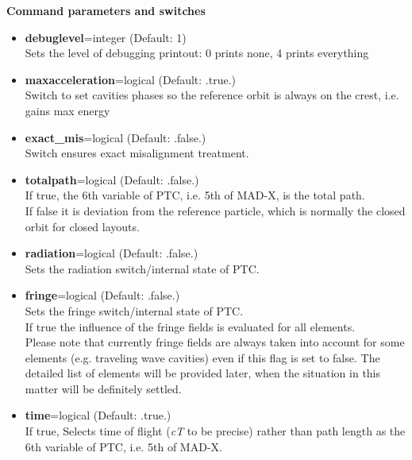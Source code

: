 {\bf Command parameters and switches}
\begin{itemize}
   \item {\bf debuglevel}=integer (Default: 1)\\
     Sets the level of debugging printout: 0 prints none, 4 prints everything   

   \item {\bf maxacceleration}=logical (Default: .true.)\\
     Switch to set cavities phases so the reference orbit is always on
     the crest, i.e. gains max energy    

   \item {\bf exact\_mis}=logical (Default: .false.)\\
     Switch ensures exact misalignment treatment.   

   \item {\bf totalpath}=logical  (Default: .false.)\\
     If true, the 6th variable of PTC, i.e. 5th of MAD-X, is the total
     path.  \\
     If false it is deviation from the reference particle,
     which is normally the closed orbit for closed layouts.    

   \item {\bf radiation}=logical (Default: .false.)\\    
     Sets the radiation switch/internal state of PTC.   

   \item {\bf fringe}=logical (Default: .false.)\\    
     Sets the fringe switch/internal state of PTC. \\ 
     If true the influence of the fringe fields is evaluated for all
     elements. \\       
     Please note that currently fringe fields are always taken into
     account for some elements (e.g. traveling wave cavities) even if
     this flag is set to false. The detailed list of elements
     will be provided later, when the situation in this matter will be
     definitely settled.    

   \item {\bf time}=logical (Default: .true.)\\  
     If true, Selects time of flight (\textit{cT} to be precise) rather
     than path length as the 6th variable of PTC, i.e. 5th of MAD-X.     
\end{itemize}


